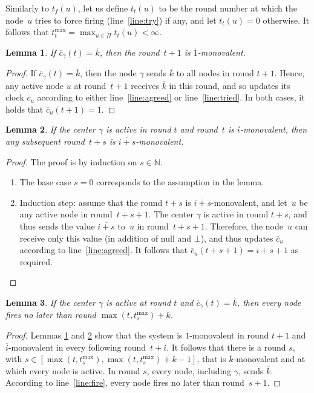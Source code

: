 \documentclass{article}
\newtheorem{lemma}{Lemma}[section]
\newcommand{\cent}{\gamma}
\newcommand{\IN}{\mathds{N}}
\newcommand{\tf}{t_{f}}
\newcommand{\try}{t_{t}}
\begin{document}
Similarly to $\tf (u)$, let us define $\try (u)$ to be  the round number at which the node~$u$ tries to force firing
	(line~\ref{line:try}) if any, and let $\try (u)= 0$ otherwise.
It follows that $\try^{\max} =  \max_{u \in \Pi}  \try(u) < \infty$.


\begin{lemma}\label{lem:k_mono}
If $\overline{c}_\cent(t) = \overline{k} $, then the round~$t +1$  is $\overline{1}$-monovalent.
\end{lemma}

\begin{proof}
If $\overline{c}_\cent(t) = \overline{k} $, then the node $\cent$ sends $\overline{k}$ to all nodes in round $t+1$.
Hence, any active node $u$ at round~$t+1$ receives $\overline{k}$ in this round,
	and so updates its clock $\overline{c}_u$ according to either line~\ref{line:agreed} or line~\ref{line:tried}.
In both cases, it holds that $\overline{c}_u (t+1) =\overline{1}$.
\end{proof}

\begin{lemma}\label{lem:mono_mono}
	If the center $\cent$ is active in round $t$  and round~$t$ is $\overline{i}$-monovalent, 
	then any subsequent round~$ t + s$ is $\overline{i+ s}$-monovalent.
\end{lemma}

\begin{proof}
The proof is by induction on $s \in \IN$.
\begin{enumerate}
		\item The base case $s=0$ corresponds to the assumption in the lemma.
		\item Induction step:  assume that the round $t+s$ is $\overline{i+s}$-monovalent,
			 and let~$u$ be  any active node in round~$t+s+1$.
			The center $\cent$ is active in round $t +s$, and thus sends the value $\overline{i+s}$ to~$u$
				in round~$ t+s+1$.
			Therefore, the node~$u$ can receive only this value (in addition of null and $\bot$), and thus updates
				$\overline{c}_u$ according to line~\ref{line:agreed}. 
			It follows that $ \overline{c}_u(t+s+1) = \overline{i+s +1}$ as required.
\end{enumerate}
\end{proof}

\begin{lemma}\label{lem:k_liv}
If the center $\cent$ is active at round $t$  and $\overline{c}_\cent(t) = \overline{k} $, 
	then every node fires no later than round $\max(t, t_s^{\max}) + k $.
\end{lemma}
\begin{proof}
Lemmas \ref{lem:k_mono} and \ref{lem:mono_mono} show that the system is $\overline{1}$-monovalent in round $t+1$
	and $\overline{i}$-monovalent in every  following round~$t+i$.
It follows that there is a round $ s $, with $ s \in [ \max ( t, t_s^{\max} )  , \max (t , t_s^{\max} ) + k  - 1] $,
	that  is $\overline{k}$-monovalent and at which every node is active.
In round $ s $, every node, including $\cent$, sends $ \overline{k} $.
According to line~\ref{line:fire}, every node fires no later than round~$s+1$.
\end{proof}
 
\end{document}
